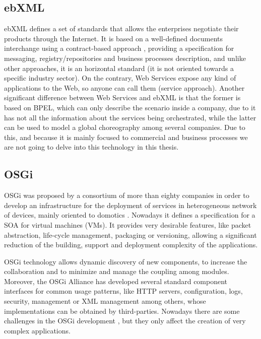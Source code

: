 \subsection{ebXML}
ebXML defines a set of standards that allows the enterprises negotiate their products through the Internet. It is based on a well-defined documents interchange using a contract-based approach \cite{Patil03ebxmlVsWS}, providing a specification for messaging, registry/repositories and business processes description, and unlike other approaches, it is an horizontal standard (it is not oriented towards a specific industry sector). On the contrary, Web Services expose any kind of applications to the Web, so anyone can call them (service approach). Another significant difference between Web Services and ebXML is that the former is based on BPEL, which can only describe the scenario inside a company, due to it has not all the information about the services being orchestrated, while the latter can be used to model a global choreography among several companies. Due to this, and because it is mainly focused to commercial and business processes we are not going to delve into this technology in this thesis.

\subsection{OSGi}

OSGi was proposed by a consortium of more than
eighty companies in order to develop an infrastructure for the
deployment of services in heterogeneous network of devices, mainly
oriented to domotics \cite{GarciaSanchez2013Gateway}. Nowadays it defines a
specification for a SOA for virtual
machines (VMs). It provides very desirable features, like
packet abstraction, life-cycle management, packaging or versioning, %
allowing a significant reduction of the building, support and deployment
complexity of the applications. 

OSGi technology allows dynamic discovery of new components, to increase the collaboration and to minimize and manage the coupling
among modules. Moreover, the
OSGi Alliance has developed several standard component interfaces for
common usage patterns, like HTTP servers, configuration, logs, security,
management or XML management among others, whose implementations can
be obtained by third-parties. Nowadays there are some challenges
in the OSGi development \cite{Kriens2008OsgiChallenges}, but they only
affect the creation of very complex applications. %

